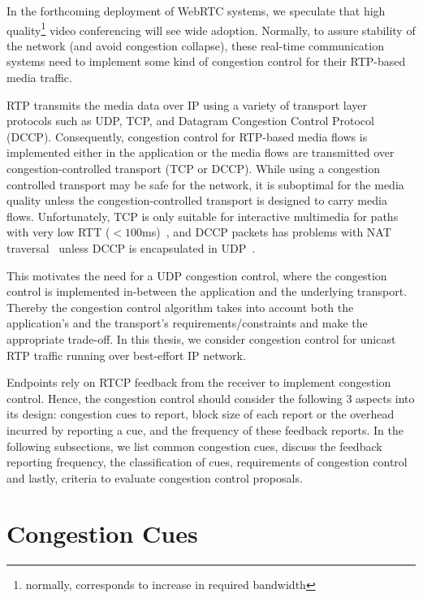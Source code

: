 In the forthcoming deployment of WebRTC systems, we speculate that high
quality\footnote{normally, corresponds to increase in required bandwidth}
video conferencing will see wide adoption. Normally, to assure stability of the
network (and avoid congestion collapse), these real-time communication systems
need to implement some kind of congestion control for their RTP-based media
traffic.

RTP transmits the media data over IP using a variety of transport layer
protocols such as UDP, TCP, and Datagram Congestion Control Protocol (DCCP).
Consequently, congestion control for RTP-based media flows is implemented
either in the application or the media flows are transmitted over
congestion-controlled transport (TCP or DCCP). While using a congestion
controlled transport may be safe for the network, it is suboptimal for the
media quality unless the congestion-controlled transport is designed to carry
media flows. Unfortunately, TCP is only suitable for interactive multimedia
for paths with very low RTT ($<100$ms)~\cite{Brosh:tcp-real-time}, and DCCP
packets has problems with NAT traversal~\cite{schier:DCCP} unless DCCP is
encapsulated in UDP~\cite{RFC6773}.

This motivates the need for a UDP congestion control, where the congestion
control is implemented in-between the application and the underlying
transport. Thereby the congestion control algorithm takes into account both
the application's and the transport's requirements/constraints and make the
appropriate trade-off. In this thesis, we consider congestion control for
unicast RTP traffic running over best-effort IP network.


Endpoints rely on RTCP feedback from the receiver to implement congestion
control. Hence, the congestion control should consider the following 3 aspects
into its design: congestion cues to report, block size of each report or the
overhead incurred by reporting a cue, and the frequency of these feedback
reports. In the following subsections, we list common congestion cues, discuss
the feedback reporting frequency, the classification of cues, requirements of
congestion control and lastly, criteria to evaluate congestion control
proposals.

\section{Congestion Cues}
\label{fw.cues}

